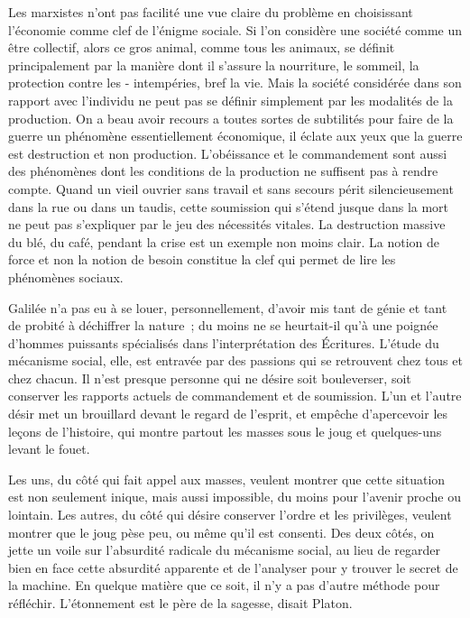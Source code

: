 \documentclass[french,twoside]{book} %
\begin{document}
Les marxistes n'ont pas facilité une vue claire du problème en choisissant l'économie comme clef de l'énigme sociale. Si l'on considère une société comme un être collectif, alors ce gros animal, comme tous les animaux, se définit principalement par la manière dont il s'assure la nourriture, le sommeil, la protection contre les - intempéries, bref la vie. Mais la société considérée dans son rapport avec l'individu ne peut pas se définir simplement par les modalités de la production. On a beau avoir recours a toutes sortes de subtilités pour faire de la guerre un phénomène essentiellement économique, il éclate aux yeux que la guerre est destruction et non production. L'obéissance et le commandement sont aussi des phénomènes dont les conditions de la production ne suffisent pas à rendre compte. Quand un vieil ouvrier sans travail et sans secours périt silencieusement dans la rue ou dans un taudis, cette soumission qui s'étend jusque dans la mort ne peut pas s'expliquer par le jeu des nécessités vitales. La destruction massive du blé, du café, pendant la crise est un exemple non moins clair. La notion de force et non la notion de besoin constitue la clef qui permet de lire les phénomènes sociaux.\par
Galilée n'a pas eu à se louer, personnellement, d'avoir mis tant de génie et tant de probité à déchiffrer la nature ; du moins ne se heurtait-il qu'à une poignée d'hommes puissants spécialisés dans l'interprétation des Écritures. L'étude du mécanisme social, elle, est entravée par des passions qui se retrouvent chez tous et chez chacun. Il n'est presque personne qui ne désire soit bouleverser, soit conserver les rapports actuels de commandement et de soumission. L'un et l'autre désir met un brouillard devant le regard de l'esprit, et empêche d'apercevoir les leçons de l'histoire, qui montre partout les masses sous le joug et quelques-uns levant le fouet.\par
Les uns, du côté qui fait appel aux masses, veulent montrer que cette situation est non seulement inique, mais aussi impossible, du moins pour l'avenir proche ou lointain. Les autres, du côté qui désire conserver l'ordre et les privilèges, veulent montrer que le joug pèse peu, ou même qu'il est consenti. Des deux côtés, on jette un voile sur l'absurdité radicale du mécanisme social, au lieu de regarder bien en face cette absurdité apparente et de l'analyser pour y trouver le secret de la machine. En quelque matière que ce soit, il n'y a pas d'autre méthode pour réfléchir. L'étonnement est le père de la sagesse, disait Platon.\par
\end{document}
